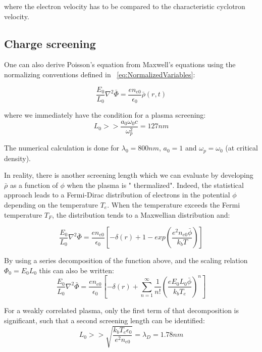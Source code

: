 \noindent where the electron velocity has to be compared to the characteristic cyclotron velocity.

\subsection{Charge screening}

\noindent One can also derive Poisson's equation from Maxwell's equations using the normalizing conventions defined in ~\ref{eq:NormalizedVariables}:

\begin{equation}
\frac{E_0}{L_0}\nabla^2 \bar{\Phi}= \frac{en_{e0}}{\epsilon_0}\bar{\rho}(r,t) 
\label{eq:Poisson}
\end{equation}

\noindent where we immediately have the condition for a plasma screening:
$$
L_0>>\frac{a_0\omega_0 c}{\omega_p^2} = 127 nm
$$

\noindent The numerical calculation is done for $\lambda_0 = 800 nm$, $a_0 = 1$ and $\omega_p = \omega_0$ (at critical density).


\noindent In reality, there is another screening length which we can evaluate by developing $\bar{\rho}$ as a function of $\phi$ when the plasma is " thermalized". Indeed, the statistical approach leads to a Fermi-Dirac distribution of electrons in the potential $\phi$ depending on the temperature $T_e$. When the temperature exceeds the Fermi temperature $T_F$, the distribution tends to a Maxwellian distribution and:

\begin{equation}
\frac{E_0}{L_0}\nabla^2 \bar{\Phi}=  \frac{en_{e0}}{\epsilon_0}[-\delta(r) + 1 - exp(\frac{e^2 n_{e0}\bar{\phi}}{k_b T})]
\end{equation}

\noindent By using a series decomposition of the function above, and the scaling relation $\Phi_0 = E_0 L_0$ this can also be written:
\begin{equation}
\frac{E_0}{L_0}\nabla^2 \bar{\Phi}=  \frac{en_{e0}}{\epsilon_0}[-\delta(r) + \sum_{n=1}^{\infty}\frac{1}{n!}(\frac{eE_0L_0\bar{\phi}}{k_b T_e})^n]
\label{eq:Poisson}
\end{equation}

\noindent For a weakly correlated plasma, only the first term of that decomposition is significant, such that a second screening length can be identified:
$$
L_0 >> \sqrt{\frac{k_b T_e \epsilon_0}{ e^2 n_{e0} }} = \lambda_D = 1.78 nm
$$

